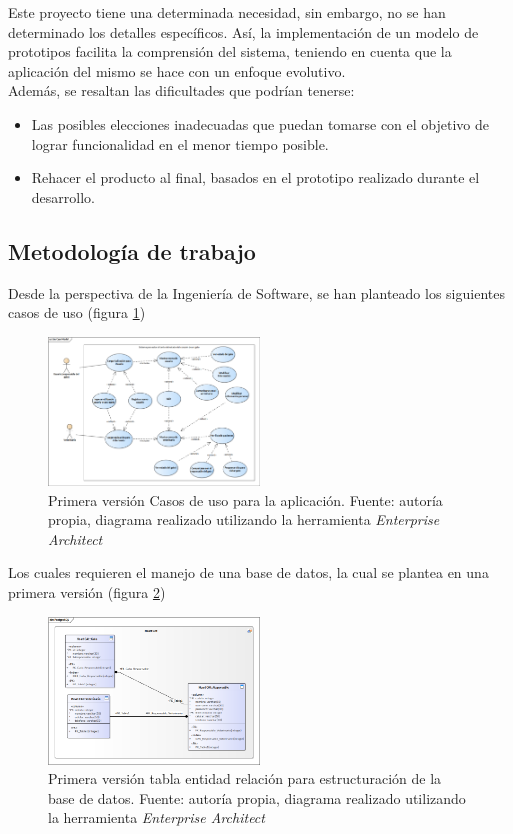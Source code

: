 \documentclass[letterpaper, 10 pt, conference]{ieeeconf}  %
\begin{document}
Este proyecto tiene una determinada necesidad, sin embargo, no se han determinado los detalles espec\'ificos. As\'i, la implementaci\'on de un modelo de prototipos facilita la comprensi\'on del sistema, teniendo en cuenta que la aplicaci\'on del mismo se hace con un enfoque evolutivo.\\

Adem\'as, se resaltan las dificultades que podr\'ian tenerse:

\begin{itemize}
    \item Las posibles elecciones inadecuadas que puedan tomarse con el objetivo de lograr funcionalidad en el menor tiempo posible.
    \item Rehacer el producto al final, basados en el prototipo realizado durante el desarrollo.
\end{itemize}


\subsection{Metodolog\'ia de trabajo}

Desde la perspectiva de la Ingenier\'ia de Software, se han planteado los siguientes casos de uso (figura \ref{fig:Casosdeuso})

\begin{figure}
\centering
\includegraphics[width=0.5\textwidth]{casousoheartcat.png}
\caption{Primera versi\'on Casos de uso para la aplicaci\'on. Fuente: autor\'ia propia, diagrama realizado utilizando la herramienta \textit{Enterprise Architect}}
\label{fig:Casosdeuso}
\end{figure}

Los cuales requieren el manejo de una base de datos, la cual se plantea en una primera versi\'on (figura \ref{fig:entidades})

\begin{figure}
\centering
\includegraphics[width=0.5\textwidth]{bdvunoheartcat.png} \caption{Primera versi\'on tabla entidad relaci\'on para estructuraci\'on de la base de datos. Fuente: autor\'ia propia, diagrama realizado utilizando la herramienta \textit{Enterprise Architect}}
\label{fig:entidades}
\end{figure}
\end{document}
